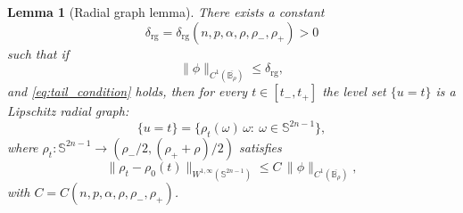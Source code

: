 \documentclass[10pt,a4paper]{amsart}
\newtheorem{lemma}{Lemma}
\newcommand{\B}{\mathbb{B}}
\newcommand{\Sn}{\mathbb{S}^{2n-1}}
\begin{document}
\begin{lemma}[Radial graph lemma]\label{lem:IFT_radial_graph}
There exists a constant
\[
\delta_{\mathrm{rg}}=\delta_{\mathrm{rg}}(n,p,\alpha,\rho,\rho_-,\rho_+)>0
\]
such that if
\[
\|\phi\|_{C^1(\overline{\B_\rho})}\le \delta_{\mathrm{rg}},
\]
and \eqref{eq:tail_condition} holds, then for every \(t\in[t_-,t_+]\) the
level set \(\{u=t\}\) is a Lipschitz radial graph:
\begin{equation}\label{eq:rho_graph}
\{u=t\}=\{\rho_t(\omega)\,\omega:\ \omega\in\Sn\},
\end{equation}
where \(\rho_t:\Sn\to(\rho_-/2,(\rho_++\rho)/2)\) satisfies
\begin{equation}\label{eq:rho_est}
\|\rho_t-\rho_0(t)\|_{W^{1,\infty}(\Sn)}
\le
C\,\|\phi\|_{C^1(\overline{\B_\rho})},
\end{equation}
with \(C=C(n,p,\alpha,\rho,\rho_-,\rho_+)\).
\end{lemma}
\end{document}
